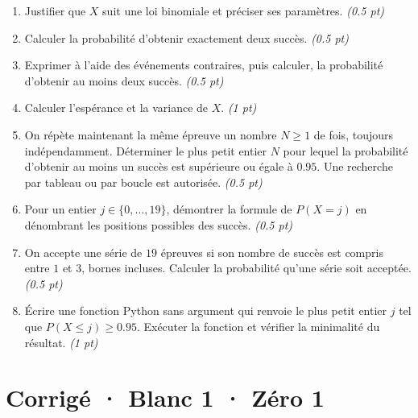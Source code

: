 \begin{enumerate}

\item Justifier que $X$ suit une loi binomiale et préciser ses paramètres. \hfill\textit{(\num{0,5} pt)}

\item Calculer la probabilité d'obtenir exactement deux succès. \hfill\textit{(\num{0,5} pt)}

\item Exprimer à l'aide des événements contraires, puis calculer, la probabilité d'obtenir au moins deux succès. \hfill\textit{(\num{0,5} pt)}

\item Calculer l'espérance et la variance de $X$. \hfill\textit{(1 pt)}

\item On répète maintenant la même épreuve un nombre $N\ge1$ de fois, toujours indépendamment. Déterminer le plus petit entier $N$ pour lequel la probabilité d'obtenir au moins un succès est supérieure ou égale à $\num{0,95}$. Une recherche par tableau ou par boucle est autorisée. \hfill\textit{(\num{0,5} pt)}

\item Pour un entier $j\in\{0,\ldots,19\}$, démontrer la formule de $P(X=j)$ en dénombrant les positions possibles des succès. \hfill\textit{(\num{0,5} pt)}

\item On accepte une série de $19$ épreuves si son nombre de succès est compris entre $1$ et $3$, bornes incluses. Calculer la probabilité qu'une série soit acceptée. \hfill\textit{(\num{0,5} pt)}

\item Écrire une fonction Python sans argument qui renvoie le plus petit entier $j$ tel que $P(X\le j)\ge\num{0,95}$. Exécuter la fonction et vérifier la minimalité du résultat. \hfill\textit{(1 pt)}

\end{enumerate}

\ifmxteacher\mxnewpage

\section*{Corrigé · Blanc 1 · Zéro 1}\label{cor:5-1}

